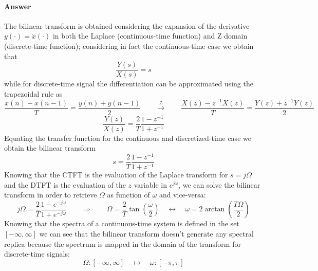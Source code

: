 	\paragraph{Answer} The bilinear transform is obtained considering the expansion of the derivative $y(\cdot) = \dot x(\cdot)$ in both the Laplace (continuous-time function) and Z domain (discrete-time function); considering in fact the continuous-time case we obtain that
	\[ \frac{Y(s)}{X(s)} = s \]
	while for discrete-time signal the differentiation can be approximated using the trapezoidal rule as
	\[ \frac{x(n) - x(n-1)}{T} = \frac{y(n)+y(n-1)}{2} \qquad \xrightarrow{\mathcal Z} \qquad \frac{X(z) - z^{-1}X(z)}T = \frac{Y(z) + z^{-1}Y(z)}{2}  \]
	\[ \frac{Y(z)}{X(z)} = \frac{2}{T} \frac{1-z^{-1}}{1+z^{-1}} \]
	Equating the transfer function for the continuous and discretized-time case we obtain the bilinear transform
	\[ s = \frac{2}{T} \frac{1-z^{-1}}{1+z^{-1}} \]
	Knowing that the CTFT is the evaluation of the Laplace transform for $s=j\Omega$ and the DTFT is the evaluation of the $z$ variable in $e^{j\omega}$, we can solve the bilinear transform in order to retrieve $\Omega$ as function of $\omega$ and vice-versa:
	\[ j\Omega = \frac 2 T \frac{1-e^{-j\omega}}{1+e^{-j\omega}} \qquad \Rightarrow \qquad \Omega = \frac 2 T \tan\left(\frac \omega 2\right) \quad \leftrightarrow \quad \omega = 2 \arctan\left( \frac{T\Omega}{2} \right)\]
	Knowing that the spectra of a continuous-time system is defined in the set $[-\infty,\infty]$ we can see that the bilinear transform doesn't generate any spectral replica because the spectrum is mapped in the domain of the transform for discrete-time signals:
	\[ \Omega: [-\infty,\infty] \quad \mapsto \quad \omega:[-\pi,\pi] \]
	
	
	
	
	
	
	
	
	
	
	
	
	
	
	
	
	
	
	
	
	